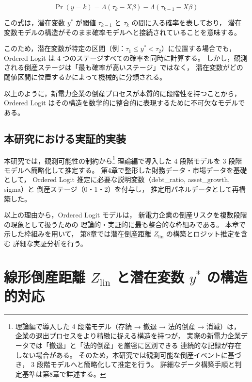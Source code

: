 \[
\Pr(y=k)
=
\Lambda(\tau_k - X\beta)
-
\Lambda(\tau_{k-1} - X\beta)
\]



この式は，潜在変数 $y^*$ が閾値 $\tau_{k-1}$ と $\tau_k$ の間に入る確率を表しており，
潜在変数モデルの構造がそのまま確率モデルへと接続されていることを意味する。

このため，潜在変数が特定の区間（例：$\tau_1 \le y^* < \tau_2$）に位置する場合でも，
Ordered Logit は 4 つのステージすべての確率を同時に計算する。
しかし，観測される倒産ステージは「最も確率が高いステージ」ではなく，
潜在変数がどの閾値区間に位置するかによって機械的に分類される。

以上のように，新電力企業の倒産プロセスが本質的に段階性を持つことから，
Ordered Logit はその構造を数学的に整合的に表現するために不可欠なモデルである。

\subsection{本研究における実証的実装}

本研究では，観測可能性の制約から\footnote{
理論編で導入した 4 段階モデル（存続 → 撤退 → 法的倒産 → 消滅）は，
企業の退出プロセスをより精緻に捉える構造を持つが，
実際の新電力企業データでは「撤退」と「法的倒産」を厳密に区別できる
連続的な記録が存在しない場合がある。
そのため，本研究では観測可能な倒産イベントに基づき，
3 段階モデルへと簡略化して推定を行う。
詳細なデータ構築手順と判定基準は第8章で詳述する。
}
理論編で導入した 4 段階モデルを 3 段階モデルへ簡略化して推定する。
第4章で整形した財務データ・市場データを基礎として，
Ordered Logit 推定に必要な説明変数（debt\_ratio, asset\_growth, sigma）と
倒産ステージ（0・1・2）を付与し，
推定用パネルデータとして再構築した。

以上の理由から，Ordered Logit モデルは，
新電力企業の倒産リスクを複数段階の現象として扱うための
理論的・実証的に最も整合的な枠組みである。
本章で示した枠組みを用いて，
第8章では潜在倒産距離 $Z_{\text{lin}}$ の構築とロジット推定を含む
詳細な実証分析を行う。



\section{線形倒産距離 $Z_{\text{lin}}$ と潜在変数 $y^*$ の構造的対応}
\label{sec:zlin_y_mapping}

